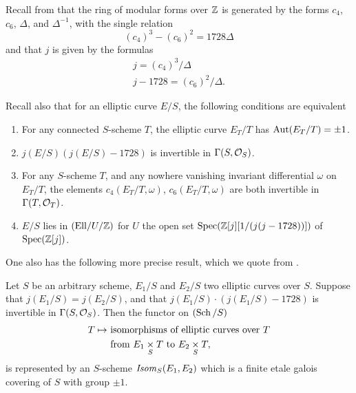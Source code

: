 \kmitem\label{item:8.4.1}
Recall from \cite{De2} that the ring of modular forms over $\mathbb{Z}$ is generated by the forms $c_4$, $c_6$, $\Delta$, and $\Delta^{-1}$, with the single relation
\[
(c_4)^3 - (c_6)^2 = 1728\Delta
\]
and that $j$ is given by the formulas
\begin{gather*}
j = (c_4)^3/\Delta \\
j - 1728 = (c_6)^2/\Delta .
\end{gather*}

\kmitem\label{item:8.4.2}
Recall also that for an elliptic curve $E/S$, the following conditions are equivalent
\begin{enumerate}[(1)]
\item For any connected $S$-scheme $T$, the elliptic curve $E_T/T$ has $\operatorname{Aut}(E_T/T) = \pm 1$.
\item $j(E/S)(j(E/S) - 1728)$ is invertible in $\Gamma(S, \mathcal{O}_S)$.
\item For any $S$-scheme $T$, and any nowhere vanishing invariant differential $\omega$ on $E_T/T$, the elements $c_4(E_T/T, \omega)$, $c_6(E_T/T, \omega)$ are both invertible in $\Gamma(T, \mathcal{O}_T)$.
\item $E/S$ lies in $(\mathrm{Ell}/U/\mathbb{Z})$ for $U$ the open set $\operatorname{Spec}(\mathbb{Z}[j][1/(j(j-1728))])$ of $\operatorname{Spec}(\mathbb{Z}[j])$.
\end{enumerate}

One also has the following more precise result, which we quote from \cite{De2}.

\begin{kprop}\label{prop:8.4.3}
Let $S$ be an arbitrary scheme, $E_1/S$ and $E_2/S$ two elliptic curves over $S$. Suppose that $j(E_1/S) = j(E_2/S)$, and that $j(E_1/S) \cdot (j(E_1/S) - 1728)$ is invertible in $\Gamma(S, \mathcal{O}_S)$. Then the functor on $(\operatorname{Sch}/S)$
\[
\begin{aligned}
T \mapsto\ &\text{isomorphisms of elliptic curves over } T \\
&\text{from } E_1 \underset{S}{\times} T \text{ to } E_2 \underset{S}{\times} T ,
\end{aligned}
\]
is represented by an $S$-scheme $\mathit{Isom}_S(E_1, E_2)$ which is a finite etale galois covering of $S$ with group $\pm 1$.
\end{kprop}

